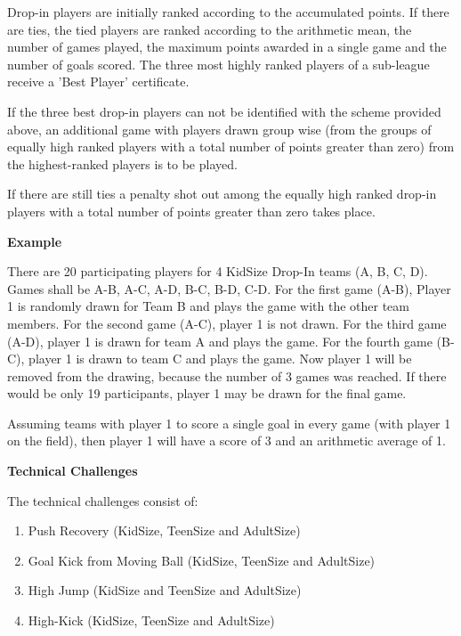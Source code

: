 Drop-in players are initially ranked according to the accumulated points. If there are ties, the tied players are ranked according to the arithmetic mean, the number of games played, the maximum points awarded in a single game and the number of goals scored. The three most highly ranked players of a sub-league receive a 'Best Player' certificate.

If the three best drop-in players can not be identified with the scheme provided above, an additional game with players drawn group wise (from the groups of equally high ranked players with a total number of points greater than zero) from the highest-ranked players is to be played.

If there are still ties a penalty shot out among the equally high ranked drop-in players with a total number of points greater than zero takes place.

\bigskip 
 
{\bfseries Example}
 
There are 20 participating players for 4 KidSize Drop-In teams (A, B, C, D). Games shall be A-B, A-C, A-D, B-C, B-D, C-D. For the first game (A-B), Player 1 is randomly drawn for Team B and plays the game with the other team members. For the second game (A-C), player 1 is not drawn. For the third game (A-D), player 1 is drawn for team A and plays the game. For the fourth game (B-C), player 1 is drawn to team C and plays the game. Now player 1 will be removed from the drawing, because the number of 3 games was reached. If there would be only 19 participants, player 1 may be drawn for the final game.

Assuming teams with player 1 to score a single goal in every game (with player 1 on the field), then player 1 will have a score of 3 and an arithmetic average of 1.

\bigskip

{\bfseries Technical Challenges}

\headlinebox

The technical challenges consist of:

\begin{enumerate}
\item Push Recovery (KidSize, TeenSize and AdultSize)
\item Goal Kick from Moving Ball (KidSize, TeenSize and AdultSize)
\item High Jump (KidSize and TeenSize and AdultSize)
\item High-Kick (KidSize, TeenSize and AdultSize)
\end{enumerate}

